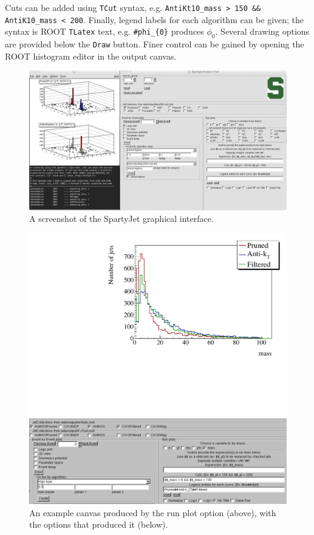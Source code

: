 \documentclass{article}
\newcommand{\prog}[1]{{\sc #1}\xspace}
\newcommand{\code}[1]{{\tt #1}\xspace}
\newcommand{\SJ}[0]{\prog{SpartyJet}}
\begin{document}
Cuts can be added using \code{TCut} syntax, e.g. \verb+AntiKt10_mass > 150 && AntiK10_mass < 200+.  Finally, legend labels for each algorithm can be given; the syntax is \prog{ROOT} \code{TLatex} text, e.g. \texttt{\#phi\_\{0\}} produces $\phi_0$.  Several drawing options are provided below the \code{Draw} button.  Finer control can be gained by opening the \prog{ROOT} histogram editor in the output canvas.

\begin{figure}[htbp]
\begin{center}
\includegraphics[width=1.2\linewidth]{GUIscreenshot.pdf}
\end{center}
\caption{A screenshot of the \SJ graphical interface.}
\label{fig:GUI}
\end{figure}

\begin{figure}[htbp]
\begin{center}
\includegraphics[width=.7\textwidth]{RunPlot.pdf}

\includegraphics[width=1.3\textwidth]{RunPlotOptions.pdf}
\end{center}
\caption{An example canvas produced by the run plot option (above), with the options that produced it (below).}
\label{fig:RunPlot}
\end{figure}
\end{document}

